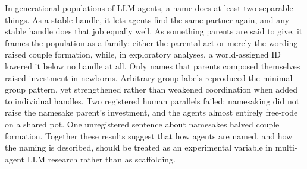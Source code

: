 In generational populations of LLM agents, a name does at least two separable things. As a
stable handle, it lets agents find the same partner again, and any stable handle does that job
equally well. As something parents are said to give, it frames the population as a family:
either the parental act or merely the wording raised couple formation, while, in exploratory
analyses, a world-assigned ID lowered it below no handle at all. Only names that parents composed themselves raised investment in
newborns. Arbitrary group labels reproduced the minimal-group pattern, yet strengthened rather than
weakened coordination when added to individual handles. Two registered human parallels failed:
namesaking did not raise the namesake parent's investment, and the agents almost entirely
free-rode on a shared pot. One unregistered sentence about namesakes halved couple formation.
Together these results suggest that how agents are named, and how the naming is described, should
be treated as an experimental variable in multi-agent LLM research rather than as scaffolding.
